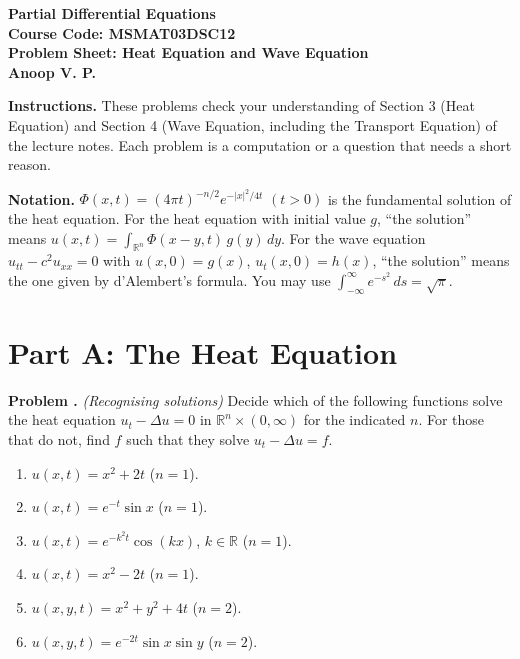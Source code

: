 \documentclass[11pt]{article}
\newcounter{prob}
\newcommand{\prob}[1]{\refstepcounter{prob}\par\medskip\noindent\textbf{Problem \theprob.} \textit{(#1)}\quad}
\begin{document}
\begin{center}
\textbf{\Large Partial Differential Equations} \\[0.5em]
\textbf{Course Code: MSMAT03DSC12} \\[0.5em]
\textbf{Problem Sheet: Heat Equation and Wave Equation} \\[0.5em]
\textbf{Anoop V. P.}
\end{center}

\noindent\textbf{Instructions.} These problems check your understanding of Section 3 (Heat Equation) and Section 4 (Wave Equation, including the Transport Equation) of the lecture notes. Each problem is a computation or a question that needs a short reason.

\smallskip
\noindent\textbf{Notation.} $\Phi(x,t) = (4\pi t)^{-n/2}e^{-|x|^2/4t}$ $(t > 0)$ is the fundamental solution of the heat equation. For the heat equation with initial value $g$, ``the solution'' means $u(x,t) = \int_{\mathbb{R}^n}\Phi(x-y,t)\,g(y)\,dy$. For the wave equation $u_{tt} - c^2u_{xx} = 0$ with $u(x,0) = g(x)$, $u_t(x,0) = h(x)$, ``the solution'' means the one given by d'Alembert's formula. You may use $\int_{-\infty}^\infty e^{-s^2}\,ds = \sqrt\pi$.

\section*{Part A: The Heat Equation}

\prob{Recognising solutions}
Decide which of the following functions solve the heat equation $u_t - \Delta u = 0$ in $\mathbb{R}^n \times (0,\infty)$ for the indicated $n$. For those that do not, find $f$ such that they solve $u_t - \Delta u = f$.
\begin{enumerate}[label=(\alph*)]
    \item $u(x,t) = x^2 + 2t$ \quad ($n = 1$).
    \item $u(x,t) = e^{-t}\sin x$ \quad ($n = 1$).
    \item $u(x,t) = e^{-k^2t}\cos(kx)$, $k \in \mathbb{R}$ \quad ($n = 1$).
    \item $u(x,t) = x^2 - 2t$ \quad ($n = 1$).
    \item $u(x,y,t) = x^2 + y^2 + 4t$ \quad ($n = 2$).
    \item $u(x,y,t) = e^{-2t}\sin x\sin y$ \quad ($n = 2$).
\end{enumerate}
\end{document}
